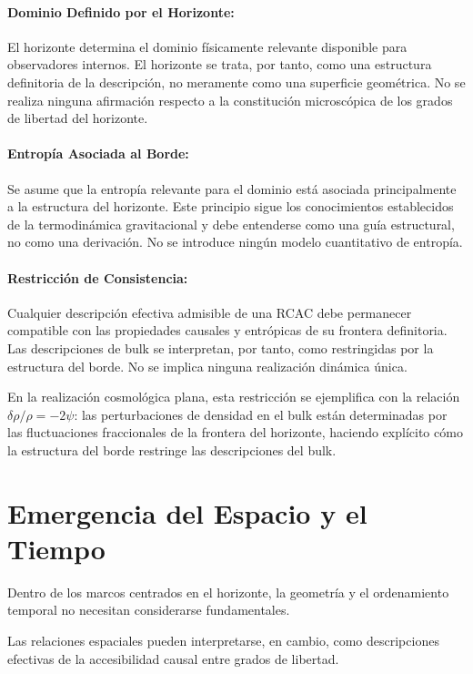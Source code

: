 \documentclass[12pt,a4paper]{article}
\begin{document}
\paragraph{Dominio Definido por el Horizonte:} El horizonte determina el dominio físicamente relevante disponible para observadores internos. El horizonte se trata, por tanto, como una estructura definitoria de la descripción, no meramente como una superficie geométrica. No se realiza ninguna afirmación respecto a la constitución microscópica de los grados de libertad del horizonte.

\paragraph{Entropía Asociada al Borde:} Se asume que la entropía relevante para el dominio está asociada principalmente a la estructura del horizonte. Este principio sigue los conocimientos establecidos de la termodinámica gravitacional y debe entenderse como una guía estructural, no como una derivación. No se introduce ningún modelo cuantitativo de entropía.

\paragraph{Restricción de Consistencia:} Cualquier descripción efectiva admisible de una RCAC debe permanecer compatible con las propiedades causales y entrópicas de su frontera definitoria. Las descripciones de bulk se interpretan, por tanto, como restringidas por la estructura del borde. No se implica ninguna realización dinámica única.

En la realización cosmológica plana, esta restricción se ejemplifica con la relación $\delta\rho/\rho = -2\psi$: las perturbaciones de densidad en el bulk están determinadas por las fluctuaciones fraccionales de la frontera del horizonte, haciendo explícito cómo la estructura del borde restringe las descripciones del bulk.

\section{Emergencia del Espacio y el Tiempo}

Dentro de los marcos centrados en el horizonte, la geometría y el ordenamiento temporal no necesitan considerarse fundamentales.

Las relaciones espaciales pueden interpretarse, en cambio, como descripciones efectivas de la accesibilidad causal entre grados de libertad.
\end{document}
